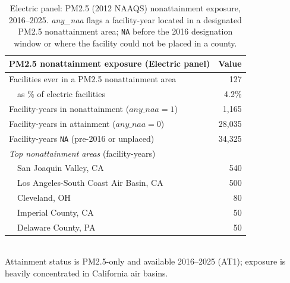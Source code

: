 \begin{table}[htbp]
\centering
\small
\caption{Electric panel: PM2.5 (2012 NAAQS) nonattainment exposure, 2016--2025. \emph{any\_naa} flags a facility-year located in a designated PM2.5 nonattainment area; \texttt{NA} before the 2016 designation window or where the facility could not be placed in a county.}
\label{tab:electric_attainment}
\begin{tabular}{lr}
\toprule
PM2.5 nonattainment exposure (Electric panel) & Value \\
\midrule
Facilities ever in a PM2.5 nonattainment area & 127 \\
\ \ as \% of electric facilities & 4.2\% \\
Facility-years in nonattainment ($any\_naa=1$) & 1,165 \\
Facility-years in attainment ($any\_naa=0$) & 28,035 \\
Facility-years \texttt{NA} (pre-2016 or unplaced) & 34,325 \\
\emph{Top nonattainment areas} (facility-years) &  \\
\ \ San Joaquin Valley, CA & 540 \\
\ \ Los Angeles-South Coast Air Basin, CA & 500 \\
\ \ Cleveland, OH & 80 \\
\ \ Imperial County, CA & 50 \\
\ \ Delaware County, PA & 50 \\
\bottomrule
\end{tabular}
\\[2pt]
{\footnotesize Attainment status is PM2.5-only and available 2016--2025 (AT1); exposure is heavily concentrated in California air basins.}
\end{table}

